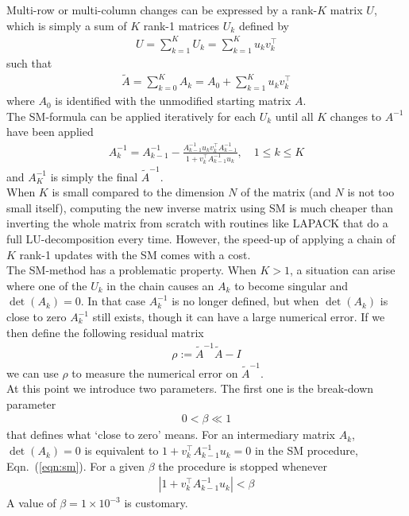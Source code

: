 \documentclass[11pt]{article}
\numberwithin{figure}{section}
\numberwithin{table}{section}
\begin{document}
			Multi-row or multi-column changes can be expressed by a rank-$K$ matrix $U$, which is simply a sum of $K$ rank-1 matrices $U_k$ defined by
			\begin{align}
				U = \sum_{k=1}^K U_k = \sum_{k=1}^K u_kv_k^\top
			\end{align}
			such that 
			\begin{align}\label{eqn:rank-k}
				\widetilde{A} = \sum_{k=0}^K A_k =  A_0 + \sum_{k=1}^K u_kv_k^\top
			\end{align}
			where $A_0$ is identified with the unmodified starting matrix $A$.\\
			
			The SM-formula can be applied iteratively for each $U_k$ until all $K$ changes to $A^{-1}$ have been applied
			\begin{align}\label{eqn:sm}
				A^{-1}_k = A^{-1}_{k-1} - \frac{A^{-1}_{k-1}u_kv_k^\top A^{-1}_{k-1}}{1+v_k^\top A^{-1}_{k-1}u_k}, \quad 1 \leq k \leq K   
			\end{align}
			and $A_K^{-1}$ is simply the final $\widetilde{A}^{-1}$.\\
			
			When $K$ is small compared to the dimension $N$ of the matrix (and $N$ is not too small itself), computing the new inverse matrix using SM is much cheaper than inverting the whole matrix from scratch with routines like LAPACK that do a full LU-decomposition every time. However, the speed-up of applying a chain of $K$ rank-1 updates with the SM comes with a cost.\\
			
			The SM-method has a problematic property. When $K>1$, a situation can arise where one of the $U_k$ in the chain causes an $A_k$ to become singular and $\det\left(A_k\right)=0$. In that case $A^{-1}_{k}$ is no longer defined, but when $\det\left(A_k\right)$ is close to zero $A^{-1}_{k}$ still exists, though it can have a large numerical error. If we  then define the following residual matrix
			\begin{align} \label{cond:singular}
				\rho := \widetilde{A}^{-1}\widetilde{A} - I
			\end{align}
			we can use $\rho$ to measure the numerical error on $\widetilde{A}^{-1}$.\\
			
			At this point we introduce two parameters. The first one is the break-down parameter
			\begin{align}\label{eqn:break-down-parameter}
				0 < \beta \ll 1
			\end{align}
			that defines what `close to zero' means. For an intermediary matrix $A_k$, $\det\left(A_k\right)=0$ is equivalent to $1+v_k^\top A^{-1}_{k-1}u_k=0$ in the SM procedure, Eqn.~(\ref{eqn:sm}). For a given $\beta$ the procedure is stopped whenever
			\begin{align}\label{eqn:break-down-condition}
				\left|1+v_k^\top A^{-1}_{k-1}u_k\right| < \beta
			\end{align}
			A value of $\beta = 1\times 10^{-3}$ is customary.\\
			
\end{document}
